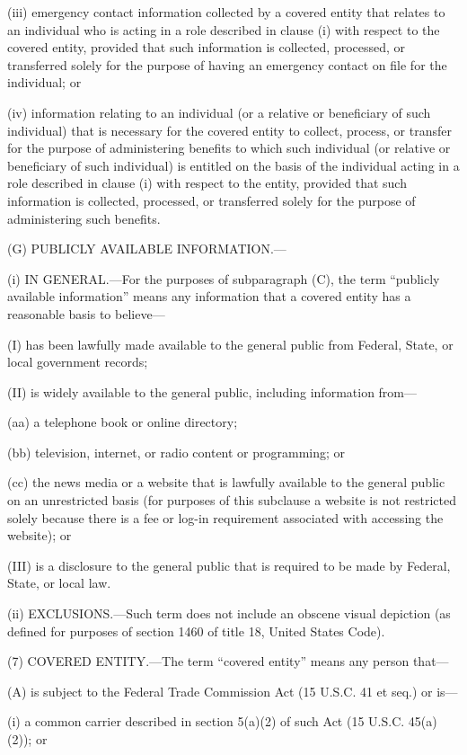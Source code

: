 (iii) emergency contact information collected by a covered entity that relates to an individual who is acting in a role described in clause (i) with respect to the covered entity, provided that such information is collected, processed, or transferred solely for the purpose of having an emergency contact on file for the individual; or

(iv) information relating to an individual (or a relative or beneficiary of such individual) that is necessary for the covered entity to collect, process, or transfer for the purpose of administering benefits to which such individual (or relative or beneficiary of such individual) is entitled on the basis of the individual acting in a role described in clause (i) with respect to the entity, provided that such information is collected, processed, or transferred solely for the purpose of administering such benefits.

(G) PUBLICLY AVAILABLE INFORMATION.—

(i) IN GENERAL.—For the purposes of subparagraph (C), the term “publicly available information” means any information that a covered entity has a reasonable basis to believe—

(I) has been lawfully made available to the general public from Federal, State, or local government records;

(II) is widely available to the general public, including information from—

(aa) a telephone book or online directory;

(bb) television, internet, or radio content or programming; or

(cc) the news media or a website that is lawfully available to the general public on an unrestricted basis (for purposes of this subclause a website is not restricted solely because there is a fee or log-in requirement associated with accessing the website); or

(III) is a disclosure to the general public that is required to be made by Federal, State, or local law.

(ii) EXCLUSIONS.—Such term does not include an obscene visual depiction (as defined for purposes of section 1460 of title 18, United States Code).

(7) COVERED ENTITY.—The term “covered entity” means any person that—

(A) is subject to the Federal Trade Commission Act (15 U.S.C. 41 et seq.) or is—

(i) a common carrier described in section 5(a)(2) of such Act (15 U.S.C. 45(a)(2)); or

